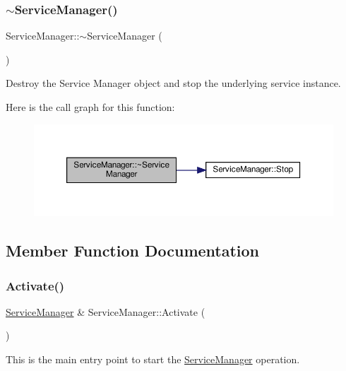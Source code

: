 \subsubsection{\texorpdfstring{$\sim$\+Service\+Manager()}{~ServiceManager()}}
{\footnotesize\ttfamily Service\+Manager\+::$\sim$\+Service\+Manager (\begin{DoxyParamCaption}{ }\end{DoxyParamCaption})\hspace{0.3cm}{\ttfamily [inline]}}



Destroy the Service Manager object and stop the underlying service instance. 

Here is the call graph for this function\+:
\nopagebreak
\begin{figure}[H]
\begin{center}
\leavevmode
\includegraphics[width=350pt]{classServiceManager_a87b207df58ccd316320d490c003c7eda_cgraph}
\end{center}
\end{figure}


\subsection{Member Function Documentation}
\mbox{\label{classServiceManager_a7d511091ce6f7a368bfc6d8caebd25c0}} 
\subsubsection{\texorpdfstring{Activate()}{Activate()}}
{\footnotesize\ttfamily \hyperlink{classServiceManager}{Service\+Manager} \& Service\+Manager\+::\+Activate (\begin{DoxyParamCaption}{ }\end{DoxyParamCaption})}

This is the main entry point to start the \hyperlink{classServiceManager}{Service\+Manager} operation.

